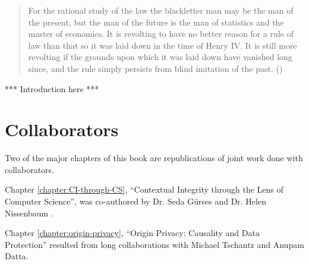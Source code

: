 \documentclass[../thesis.tex]{subfiles}
\begin{document}
 \begin{quote}
 For the rational study of the law the blackletter man may be the man of the present, but the man of the future is the man of statistics and the master of economics. It is revolting to have no better reason for a rule of law than that so it was laid down in the time of Henry IV. It is still more revolting if the grounds upon which it was laid down have vanished long since, and the rule simply persists from blind imitation of the past. (\citet{holmes1897path})
 \end{quote}
 
 
*** Introduction here *** 
  

 
 
 \section{Collaborators}

 Two of the major chapters of this book are republications of
 joint work done with collaborators.

 Chapter \ref{chapter:CI-through-CS}, ``Contextual Integrity through the Lens of Computer Science'',
 was co-authored by Dr. Seda G{\"u}rses and Dr. Helen Nissenbaum \cite{benthall2017contextual}.

 Chapter \ref{chapter:origin-privacy}, ``Origin Privacy: Causality and Data Protection'' resulted from
 long collaborations with Michael Tschantz and Anupam Datta. 
\end{document}
